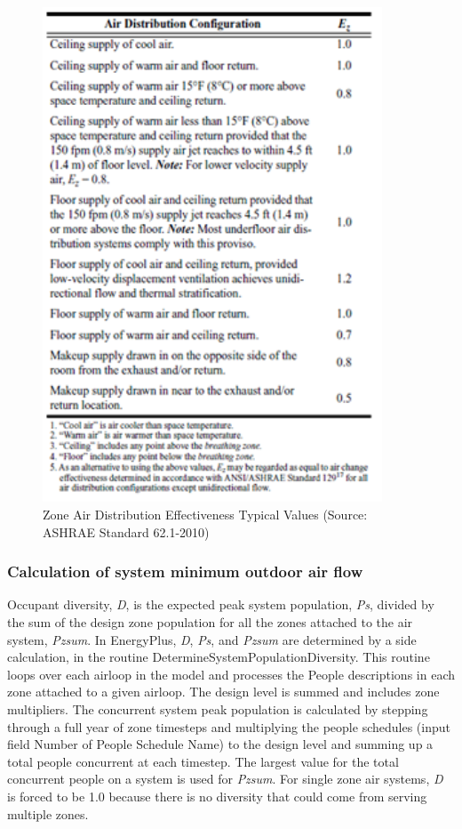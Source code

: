 \begin{figure}[hbtp] %
\centering
\includegraphics[width=0.9\textwidth, height=0.9\textheight, keepaspectratio=true]{media/image4716.png}
\caption{Zone Air Distribution Effectiveness Typical Values (Source: ASHRAE Standard 62.1-2010) \protect \label{fig:zone-air-distribution-effectiveness-typical}}
\end{figure}

\subsubsection{Calculation of system minimum outdoor air flow}\label{calculation-of-system-minimum-outdoor-air-flow}

Occupant diversity, \emph{D}, is the expected peak system population, \emph{Ps}, divided by the sum of the design zone population for all the zones attached to the air system, \emph{Pzsum}. In EnergyPlus, \emph{D}, \emph{Ps}, and \emph{Pzsum} are determined by a side calculation, in the routine DetermineSystemPopulationDiversity.  This routine loops over each airloop in the model and processes the People descriptions in each zone attached to a given airloop.  The design level is summed and includes zone multipliers.  The concurrent system peak population is calculated by stepping through a full year of zone timesteps and multiplying the people schedules (input field Number of People Schedule Name) to the design level and summing up a total people concurrent at each timestep.  The largest value for the total concurrent people on a system is used for \emph{Pzsum}.  For single zone air systems, \emph{D} is forced to be 1.0 because there is no diversity that could come from serving multiple zones. 

